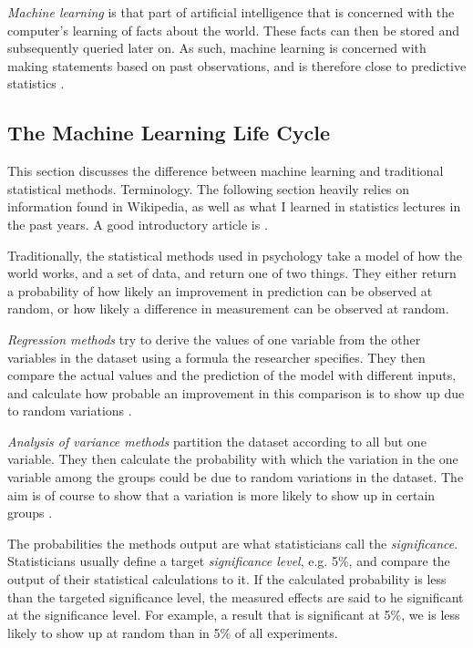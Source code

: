 \documentclass[a4paper,man,12pt,apacite,floatsintext,draftfirst]{apa6} %
\begin{document}
\emph{Machine learning} is that part of artificial intelligence that
is concerned with the computer's learning of facts about the world.
These facts can then be stored and subsequently queried later on.
As such, machine learning is concerned with making statements based
on past observations, and is therefore close to predictive statistics
\cite{wpML}.

\subsection{The Machine Learning Life Cycle}
This section discusses the difference between machine learning and traditional
statistical methods. Terminology.
The following section heavily relies on information found in Wikipedia, as
well as what I learned in statistics lectures in the past years.
A good introductory article is \cite{wpML}.

Traditionally, the statistical methods used in psychology
take a model of how the world works, and a set of data, and return one of
two things.
They either return a probability of how likely an improvement in prediction
can be observed at random, or how likely a difference in measurement can be
observed at random.

\emph{Regression methods} try to derive the values of
one variable from the other variables in the dataset using a formula the
researcher specifies.
They then compare the actual values and the prediction of the model with
different inputs, and calculate how probable an improvement in this
comparison is to show up due to random variations \cite{wpRA}.

\emph{Analysis of variance methods} partition the dataset
according to all but one variable. They then calculate the probability with
which the variation in the one variable among the groups could be due to
random variations in the dataset.
The aim is of course to show that a variation is more likely to show up in
certain groups \cite{wpAOV}.

The probabilities the methods output are what statisticians call the
\emph{significance}.
Statisticians usually define a target \emph{significance level},
e.g. 5\%, and compare the output of their statistical calculations to it.
If the calculated probability is less than the targeted significance level,
the measured effects are said to he significant at the significance level.
For example, a result that is significant at 5\%, we is less
likely to show up at random than in 5\% of all experiments.
\end{document}

